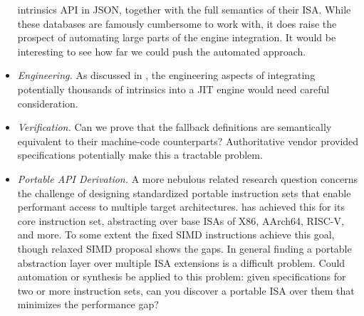 \begin{itemize}
        intrinsics API in JSON, together with the full semantics of their ISA.
        While these databases are famously cumbersome to work with, it does
        raise the prospect of automating large parts of the engine integration.
        It would be interesting to see how far we could push the automated
        approach.
    \item \emph{Engineering.}
        As discussed in , the engineering aspects of
        integrating potentially thousands of intrinsics into a JIT engine would
        need careful consideration.
    \item \emph{Verification.}
        Can we prove that the fallback definitions are semantically equivalent
        to their machine-code counterparts? Authoritative vendor provided
        specifications potentially make this a tractable problem.
    \item \emph{Portable API Derivation.}
        A more nebulous related research question concerns the challenge of
        designing standardized portable instruction sets that enable performant
        access to multiple target architectures.  \wasm has achieved this for
        its core instruction set, abstracting over base ISAs of X86, AArch64,
        RISC-V, and more.  To some extent the fixed SIMD instructions achieve
        this goal, though relaxed SIMD proposal shows the gaps. In general
        finding a portable abstraction layer over multiple ISA extensions is a
        difficult problem.  Could automation or synthesis be applied to this
        problem: given specifications for two or more instruction sets, can you
        discover a portable ISA over them that minimizes the performance gap?
\end{itemize}
